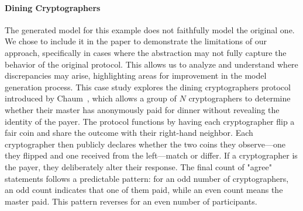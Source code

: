 \paragraph{Dining Cryptographers}
The generated model for this example does not faithfully model the original one. We chose 
to include it in the paper to demonstrate the limitations of our approach, 
specifically in cases where the abstraction may not fully capture the behavior of the original protocol. 
This allows us to analyze and understand where discrepancies may arise, 
highlighting areas for improvement in the model generation process.
This case study explores the dining cryptographers protocol introduced by Chaum~\cite{Cha88}, which allows a group of $N$ cryptographers to determine whether their master has anonymously paid for dinner without revealing the identity of the payer. The protocol functions by having each cryptographer flip a fair coin and share the outcome with their right-hand neighbor. Each cryptographer then publicly declares whether the two coins they observe—one they flipped and one received from the left—match or differ. If a cryptographer is the payer, they deliberately alter their response. The final count of "agree" statements follows a predictable pattern: for an odd number of cryptographers, an odd count indicates that one of them paid, while an even count means the master paid. This pattern reverses for an even number of participants.

